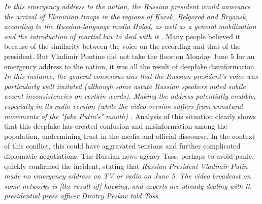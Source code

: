  \emph{In this emergency address to the nation, the Russian president would announce the arrival of Ukrainian troops in the regions of Kursk, Belgorod and Bryansk, according to the Russian-language media Holod, as well as a general mobilization and the introduction of martial law to deal with it \cite{coquazDeepfakeFauxMessage}.}
Many people believed it because of the similarity between the voice on the recording and that of the president. But Vladimir Poutine did not take the floor on Monday June 5 for an emergency address to the nation, it was all the result of deepfake disinformation. 
\emph{In this instance, the general consensus was that the Russian president's voice was particularly well imitated (although some astute Russian speakers noted subtle accent inconsistencies on certain words). Making the address potentially credible, especially in its radio version (while the video version suffers from unnatural movements of the "fake Putin's" mouth) \cite{coquazDeepfakeFauxMessage}.}
Analysis of this situation clearly shows that this deepfake has created confusion and misinformation among the population, undermining trust in the media and official discourse. In the context of this conflict, this could have aggravated tensions and further complicated diplomatic negotiations. The Russian news agency Tass, perhaps to avoid panic, quickly confirmed the incident, stating that \emph{Russian President Vladimir Putin made no emergency address on TV or radio on June 5. The video broadcast on some networks is [the result of] hacking, and experts are already dealing with it, presidential press officer Dmitry Peskov told Tass.\cite{coquazDeepfakeFauxMessage}}